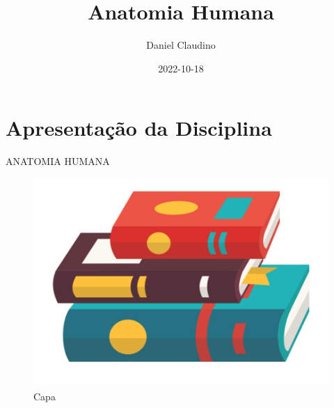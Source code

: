 \documentclass[
]{book}
\title{Anatomia Humana}
\author{Daniel Claudino}
\date{2022-10-18}
\begin{document}
\maketitle

{
\setcounter{tocdepth}{1}
\tableofcontents
}
\hypertarget{apresentauxe7uxe3o-da-disciplina}{%
\chapter{Apresentação da Disciplina}\label{apresentauxe7uxe3o-da-disciplina}}

ANATOMIA HUMANA

\begin{figure}

{\centering \includegraphics[width=0.5\linewidth]{figuras/LIVRO-GENERICO} 

}

\caption{Capa}\label{fig:unnamed-chunk-1}
\end{figure}
\end{document}
